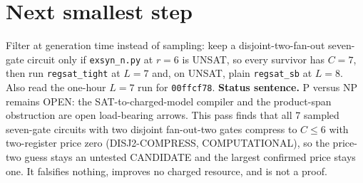 \documentclass[11pt]{article}
\begin{document}
\section*{Next smallest step}
Filter at generation time instead of sampling: keep a disjoint-two-fan-out seven-gate circuit only if \texttt{exsyn\_n.py} at $r=6$ is UNSAT, so every survivor has $C=7$, then run \texttt{regsat\_tight} at $L=7$ and, on UNSAT, plain \texttt{regsat\_sb} at $L=8$. Also read the one-hour $L=7$ run for \texttt{00ffcf78}.
\bigskip
\noindent\textbf{Status sentence.} P versus NP remains OPEN: the SAT-to-charged-model compiler and the product-span obstruction are open load-bearing arrows. This pass finds that all 7 sampled seven-gate circuits with two disjoint fan-out-two gates compress to $C\le6$ with two-register price zero (DISJ2-COMPRESS, COMPUTATIONAL), so the price-two guess stays an untested CANDIDATE and the largest confirmed price stays one. It falsifies nothing, improves no charged resource, and is not a proof.
\end{document}
